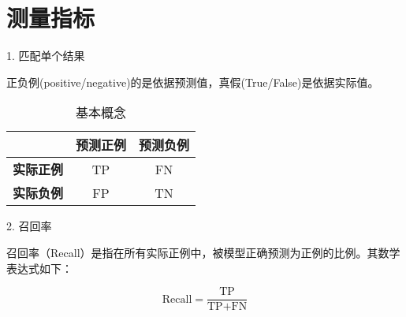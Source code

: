 \chapter{测量指标}
1. 匹配单个结果

正负例(positive/negative)的是依据预测值，真假(True/False)是依据实际值。

\begin{table}[h!]
	\centering
	\caption{基本概念}
	\label{tab:confusion_matrix}
	\begin{tabular}{l c c}
		\toprule
		& \textbf{预测正例} & \textbf{预测负例} \\
		\midrule
		\textbf{实际正例} & TP & FN \\
		\textbf{实际负例} & FP & TN \\
		\bottomrule
	\end{tabular}
\end{table}

2. 召回率

召回率（Recall）是指在所有实际正例中，被模型正确预测为正例的比例。其数学表达式如下：

\[
\text{Recall} = \frac{\text{TP}}{\text{TP} + \text{FN}}
\]




